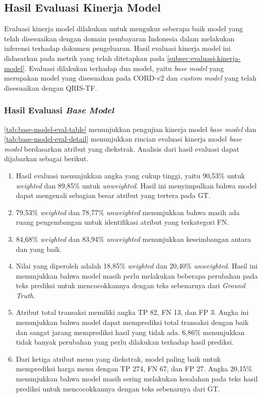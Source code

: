 \subsection{Hasil Evaluasi Kinerja Model}
\label{subsec:hasil-evaluasi-kinerja-model}

Evaluasi kinerja model dilakukan untuk mengukur seberapa baik model \donut{} yang telah disesuaikan dengan domain pembayaran Indonesia dalam melakukan inferensi terhadap dokumen pengeluaran. 
Hasil evaluasi kinerja model ini didasarkan pada metrik yang telah ditetapkan pada \autoref{subsec:evaluasi-kinerja-model}. Evaluasi dilakukan terhadap dua model, yaitu \emph{base model} yang merupakan model \donut{} yang disesuaikan pada \dataset{} CORD-v2 dan \emph{custom model} yang telah disesuaikan dengan \dataset{} QRIS-TF.

\subsubsection{Hasil Evaluasi \emph{Base Model}}
\label{subsubsec:hasil-evaluasi-base-model}
\autoref{tab:base-model-eval-table} menunjukkan pengujian kinerja model \emph{base model} dan \autoref{tab:base-model-eval-detail} menunjukkan rincian evaluasi kinerja model \emph{base model} berdasarkan atribut yang diekstrak. Analisis dari hasil evaluasi dapat dijabarkan sebagai berikut.
\begin{enumerate}
    \item Hasil evaluasi menunjukkan angka \precision{} yang cukup tinggi, yaitu 90,53\% untuk \emph{weighted} dan 89,85\% untuk \emph{unweighted}. Hasil ini menyimpulkan bahwa model dapat mengenali sebagian besar atribut yang tertera pada GT.
    \item \recallfl{} 79,53\% \emph{weighted} dan 78,77\% \emph{unweighted} menunjukkan bahwa masih ada ruang pengembangan untuk identifikasi atribut yang terkategori FN.
    \item \fscore{} 84,68\% \emph{weighted} dan 83,94\% \emph{unweighted} menunjukkan keseimbangan antara \precision{} dan \recall{} yang baik.
    \item Nilai \mcer{} yang diperoleh adalah 18,85\% \emph{weighted} dan 20,40\% \emph{unweighted}. Hasil ini menunjukkan bahwa model masih perlu melakukan beberapa perubahan pada teks prediksi untuk mencocokkannya dengan teks sebenarnya dari \emph{Ground Truth}.
    \item Atribut total transaksi memiliki angka TP 82, FN 13, dan FP 3. Angka ini menunjukkan bahwa model dapat memprediksi total transaksi dengan baik dan sangat jarang memprediksi hasil yang tidak ada. \mcer{} 6,86\% menunjukkan tidak banyak perubahan yang perlu dilakukan terhadap hasil prediksi. 
    \item Dari ketiga atribut menu yang diekstrak, model paling baik untuk memprediksi harga menu dengan TP 274, FN 67, dan FP 27. Angka \mcer{} 20,15\% menunjukkan bahwa model masih sering melakukan kesalahan pada teks hasil prediksi untuk mencocokkannya dengan teks sebenarnya dari GT.
\end{enumerate}

